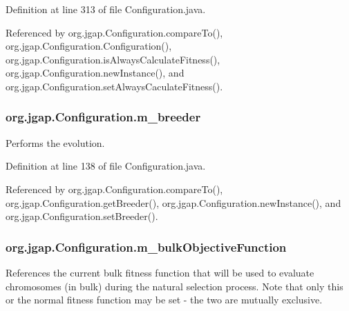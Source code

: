 Definition at line 313 of file Configuration.\-java.



Referenced by org.\-jgap.\-Configuration.\-compare\-To(), org.\-jgap.\-Configuration.\-Configuration(), org.\-jgap.\-Configuration.\-is\-Always\-Calculate\-Fitness(), org.\-jgap.\-Configuration.\-new\-Instance(), and org.\-jgap.\-Configuration.\-set\-Always\-Caculate\-Fitness().

\hypertarget{classorg_1_1jgap_1_1_configuration_ab64a248deded7963b22630652ef93f1d}{
\subsubsection[{m\-\_\-breeder}]{ org.\-jgap.\-Configuration.\-m\-\_\-breeder\hspace{0.3cm}{\ttfamily [private]}}}\label{classorg_1_1jgap_1_1_configuration_ab64a248deded7963b22630652ef93f1d}
Performs the evolution. 

Definition at line 138 of file Configuration.\-java.



Referenced by org.\-jgap.\-Configuration.\-compare\-To(), org.\-jgap.\-Configuration.\-get\-Breeder(), org.\-jgap.\-Configuration.\-new\-Instance(), and org.\-jgap.\-Configuration.\-set\-Breeder().

\hypertarget{classorg_1_1jgap_1_1_configuration_ab58e4914e10b2c708a422f9dac2d6702}{
\subsubsection[{m\-\_\-bulk\-Objective\-Function}]{ org.\-jgap.\-Configuration.\-m\-\_\-bulk\-Objective\-Function\hspace{0.3cm}{\ttfamily [private]}}}\label{classorg_1_1jgap_1_1_configuration_ab58e4914e10b2c708a422f9dac2d6702}
References the current bulk fitness function that will be used to evaluate chromosomes (in bulk) during the natural selection process. Note that only this or the normal fitness function may be set -\/ the two are mutually exclusive.

